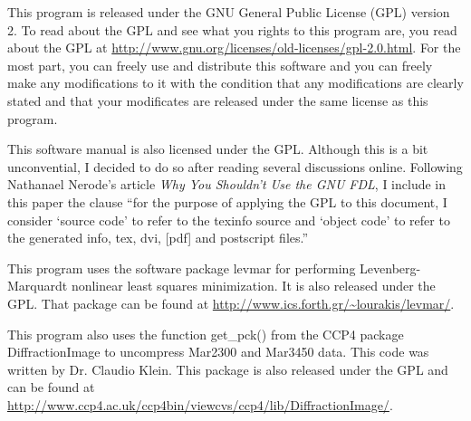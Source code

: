 This program is released under the GNU General
Public License (GPL) version 2.
To read about
the GPL and see what you rights to this program are,
you read about the GPL at
\url{http://www.gnu.org/licenses/old-licenses/gpl-2.0.html}.
For the most part, you can freely use and distribute 
this software and you can freely make any modifications to 
it with the condition that any modifications are clearly stated 
and that your modificates are released under the same license as
this program.

This software manual is also licensed under the GPL. Although
this is a bit unconvential, I decided to do so after reading
several discussions online. Following Nathanael Nerode's 
article {\em Why You Shouldn't Use the GNU FDL}, I include in
this paper the clause ``for the purpose of applying the GPL to 
this document, I consider `source code' to refer to the texinfo 
source and `object code' to refer to the generated info, tex, 
dvi, [pdf] and postscript files.''\cite{Nerode03}

This program uses the software package
levmar for performing Levenberg-Marquardt nonlinear
least squares minimization.
It is also released under the GPL. That package can be 
found at \url{http://www.ics.forth.gr/~lourakis/levmar/}.\cite{lourakis04LM}

This program also uses the function get\_pck() from the CCP4 package
DiffractionImage to uncompress Mar2300 and Mar3450 data. This code was
written by Dr. Claudio Klein. This package is 
also released under the GPL and can be found at
\url{http://www.ccp4.ac.uk/ccp4bin/viewcvs/ccp4/lib/DiffractionImage/}\cite{Klein95}.



